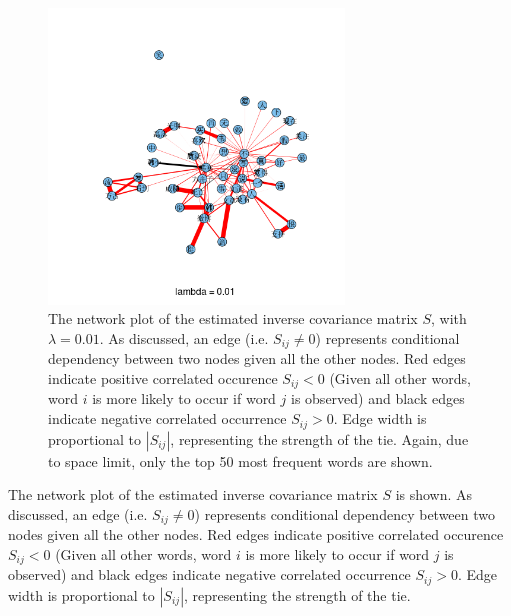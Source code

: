 \documentclass[11pt]{article}
\newcommand{\1}[1]{{\mathbf 1}\left\{#1\right\}}        %
\begin{document}
\begin{center}
\begin{figure}[tb]
   \centering
   \includegraphics[width=0.7\textwidth]{../gLassoResults/glasso1.png} 
      \caption{The network plot of the estimated inverse covariance matrix $S$, with $\lambda = 0.01$. As discussed, an edge (i.e. $S_{ij}\neq 0$) represents conditional dependency between two nodes given all the other nodes. Red edges indicate positive correlated occurence $S_{ij}<0$ (Given all other words, word $i$ is more likely to occur if word $j$ is observed) and black edges indicate negative correlated occurrence $S_{ij}>0$. Edge width is proportional to $|S_{ij}|$, representing the strength of the tie. Again, due to space limit, only the top 50 most frequent words are shown.}
   \label{fig:glasso1}
\end{figure}
\end{center}


The network plot of the estimated inverse covariance matrix $S$ is shown. As discussed, an edge (i.e. $S_{ij}\neq 0$) represents conditional dependency between two nodes given all the other nodes. Red edges indicate positive correlated occurence $S_{ij}<0$ (Given all other words, word $i$ is more likely to occur if word $j$ is observed) and black edges indicate negative correlated occurrence $S_{ij}>0$. Edge width is proportional to $|S_{ij}|$, representing the strength of the tie.
\end{document}
